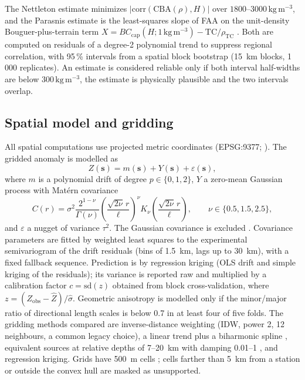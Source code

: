 \documentclass[11pt,a4paper]{article}
\newcommand{\kgm}{\ensuremath{\,\mathrm{kg\,m^{-3}}}}
\begin{document}
The Nettleton estimate minimizes $|\mathrm{corr}(\mathrm{CBA}(\rho),H)|$ over $1800$--$3000\kgm$, and the Parasnis estimate is the least-squares slope of FAA on the unit-density Bouguer-plus-terrain term $X=BC_\mathrm{cap}(H;1\kgm)-\mathrm{TC}/\rho_\mathrm{TC}$ \citep{Nettleton1939,Parasnis1952}. Both are computed on residuals of a degree-2 polynomial trend to suppress regional correlation, with 95\,\% intervals from a spatial block bootstrap (\SI{15}{km} blocks, 1\,000 replicates). An estimate is considered reliable only if both interval half-widths are below $300\kgm$, the estimate is physically plausible and the two intervals overlap.

\subsection{Spatial model and gridding}

All spatial computations use projected metric coordinates (EPSG:9377; \citealp{IGAC2020}). The gridded anomaly is modelled as
\begin{equation}
Z(\mathbf{s})=m(\mathbf{s})+Y(\mathbf{s})+\varepsilon(\mathbf{s}),
\end{equation}
where $m$ is a polynomial drift of degree $p\in\{0,1,2\}$, $Y$ a zero-mean Gaussian process with Mat\'ern covariance
\begin{equation}
C(r)=\sigma^2\frac{2^{1-\nu}}{\Gamma(\nu)}\left(\frac{\sqrt{2\nu}\,r}{\ell}\right)^{\nu}K_\nu\!\left(\frac{\sqrt{2\nu}\,r}{\ell}\right),\qquad \nu\in\{0.5,1.5,2.5\},
\end{equation}
and $\varepsilon$ a nugget of variance $\tau^2$. The Gaussian covariance is excluded \citep{Stein1999}. Covariance parameters are fitted by weighted least squares to the experimental semivariogram of the drift residuals \citep{Cressie1985} (bins of \SI{1.5}{km}, lags up to \SI{30}{km}), with a fixed fallback sequence. Prediction is by regression kriging (OLS drift and simple kriging of the residuals); its variance is reported raw and multiplied by a calibration factor $c=\mathrm{sd}(z)$ obtained from block cross-validation, where $z=(Z_\mathrm{obs}-\hat Z)/\hat\sigma$. Geometric anisotropy is modelled only if the minor/major ratio of directional length scales is below 0.7 in at least four of five folds. The gridding methods compared are inverse-distance weighting (IDW, power 2, 12 neighbours, a common legacy choice), a linear trend plus a biharmonic spline \citep{Uieda2018}, equivalent sources at relative depths of 7--\SI{20}{km} with damping 0.01--1 \citep{SolerUieda2021,Harmonica}, and regression kriging. Grids have \SI{500}{m} cells \citep{Hengl2006}; cells farther than \SI{5}{km} from a station or outside the convex hull are masked as unsupported.
\end{document}
